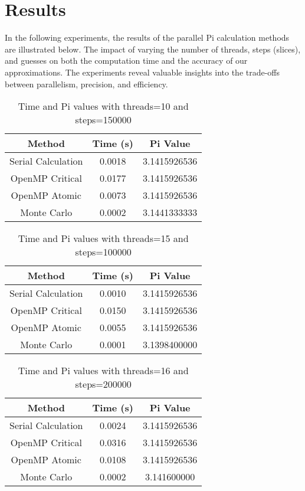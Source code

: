 \documentclass[11pt, twocolumn]{article}
\begin{document}
\section{Results}
In the following experiments, the results of the parallel Pi calculation methods are illustrated below. The impact of varying the number of threads, steps (slices), and guesses on both the computation time and the accuracy of our approximations. The experiments reveal valuable insights into the trade-offs between parallelism, precision, and efficiency.

\begin{table}[H]
    \centering
    \begin{tabular}{|c|c|c|}
    \hline
    Method & Time (s) & Pi Value \\
    \hline
    Serial Calculation & 0.0018 & 3.1415926536 \\
    OpenMP Critical & 0.0177 & 3.1415926536 \\
    OpenMP Atomic & 0.0073 & 3.1415926536 \\
    Monte Carlo & 0.0002 & 3.1441333333 \\
    \hline
    \end{tabular}
    \caption{Time and Pi values with threads=10 and steps=150000}
\end{table}

\begin{table}[H]
    \centering
    \begin{tabular}{|c|c|c|}
    \hline
    Method & Time (s) & Pi Value \\
    \hline
    Serial Calculation & 0.0010 & 3.1415926536 \\
    OpenMP Critical & 0.0150 & 3.1415926536 \\
    OpenMP Atomic & 0.0055 & 3.1415926536 \\
    Monte Carlo & 0.0001 & 3.1398400000 \\
    \hline
    \end{tabular}
    \caption{Time and Pi values with threads=15 and steps=100000}
\end{table}

\begin{table}[H]
    \centering
    \begin{tabular}{|c|c|c|}
    \hline
    Method & Time (s) & Pi Value \\
    \hline
    Serial Calculation & 0.0024 & 3.1415926536 \\
    OpenMP Critical & 0.0316 & 3.1415926536 \\
    OpenMP Atomic & 0.0108 & 3.1415926536 \\
    Monte Carlo & 0.0002 & 3.141600000 \\
    \hline
    \end{tabular}
    \caption{Time and Pi values with threads=16 and steps=200000}
\end{table}
\end{document}
